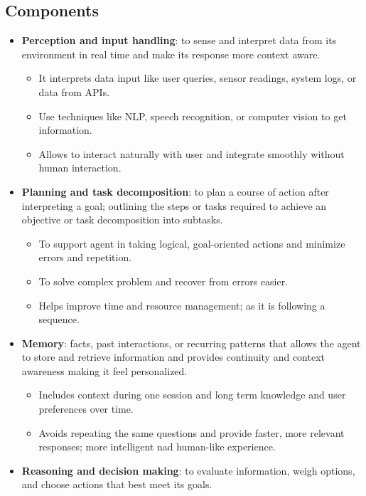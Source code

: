 \documentclass[12pt, letterpaper]{article}
\begin{document}
\subsection{Components}
\begin{itemize}
    \item \textbf{Perception and input handling}: to sense and interpret data from its environment in real time and make its response more context aware.
        \begin{itemize}
            \item It interprets data input like user queries, sensor readings, system logs, or data from APIs.
            \item Use techniques like NLP, speech recognition, or computer vision to get information.
            \item Allows to interact naturally with user and integrate smoothly without human interaction.
        \end{itemize}
    \item \textbf{Planning and task decomposition}: to plan a course of action after interpreting a goal; outlining the steps or tasks required to achieve an objective or task decomposition into subtasks.
        \begin{itemize}
            \item To support agent in taking logical, goal-oriented actions and minimize errors and repetition.
            \item To solve complex problem and recover from errors easier.
            \item Helps improve time and resource management; as it is following a sequence.
        \end{itemize}
    \item \textbf{Memory}: facts, past interactions, or recurring patterns that allows the agent to store and retrieve information and provides continuity and context awareness making it feel personalized. 
        \begin{itemize}
            \item Includes context during one session and long term knowledge and user preferences over time.
            \item Avoids repeating the same questions and provide faster, more relevant responses; more intelligent nad human-like experience.
        \end{itemize}
    \item \textbf{Reasoning and decision making}: to evaluate information, weigh options, and choose actions that best meet its goals.

\end{itemize}
\end{document}
